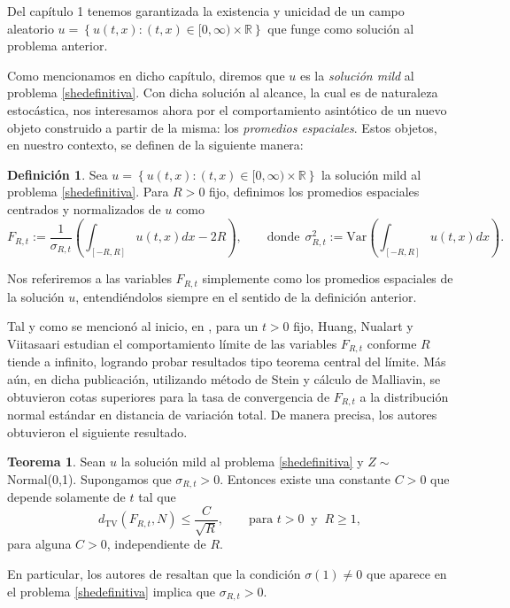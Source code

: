 \documentclass[letterpaper,twoside,12pt]{book}
\newcommand{\R}{\mathbb{R}}
\newcommand{\1}{\mathds{1}}
\theoremstyle{definition}
\newtheorem{dfn}{Definición}
\theoremstyle{definition}
\newtheorem{teo}{Teorema}
\theoremstyle{remark}
\theoremstyle{definition}
\theoremstyle{definition}
\theoremstyle{definition}
\theoremstyle{definition}
\theoremstyle{definition}
\begin{document}
Del capítulo 1 tenemos garantizada la existencia y unicidad de un campo aleatorio  $u=\left\{u(t,x):(t,x)\in [0,\infty)\times\R\right\}$ que funge como solución al problema anterior. 

Como mencionamos en dicho capítulo, diremos que $u$ es la \textit{solución mild} al problema \eqref{shedefinitiva}. Con dicha solución al alcance, la cual es de naturaleza estocástica, nos interesamos ahora por el comportamiento asintótico de un nuevo objeto construido a partir de la misma: los \textit{promedios espaciales}. Estos objetos, en nuestro contexto, se definen de la siguiente manera:

\begin{dfn}\label{defpromediosespaciales}
 Sea $u=\left\{u(t,x):(t,x)\in [0,\infty)\times\R\right\}$ la solución mild al problema \eqref{shedefinitiva}. Para $R>0$ fijo, definimos los promedios espaciales centrados y normalizados de $u$ como 
 \begin{equation*}
   F_{R,t}:=\frac{1}{\sigma_{R,t}}\left(\int_{[-R,R]}u(t,x)dx -2R\right), \qquad \text{donde} \ \ \sigma^2_{R,t}:=\text{Var}\left(\int_{[-R,R]}u(t,x)dx\right).
\end{equation*}
 \end{dfn}
Nos referiremos a las variables $F_{R,t}$ simplemente como los promedios espaciales de la solución $u$, entendiéndolos siempre en el sentido de la definición anterior.

Tal y como se mencionó al inicio, en \cite{HUANG20207170}, para un $t>0$ fijo, Huang, Nualart y Viitasaari estudian el comportamiento límite de las variables $F_{R,t}$ conforme $R$ tiende a infinito, logrando probar resultados tipo teorema central del límite. Más aún, en dicha publicación, utilizando método de Stein y cálculo de Malliavin, se obtuvieron cotas superiores para la tasa de convergencia de $F_{R,t}$ a la distribución normal estándar en distancia de variación total. De manera precisa, los autores obtuvieron el siguiente resultado.

\begin{teo} 
 Sean $u$ la solución mild al problema \eqref{shedefinitiva} y $Z\sim$ Normal(0,1). Supongamos que $\sigma_{R,t}>0$. Entonces existe una constante $C>0$ que depende solamente de $t$ tal que 
 \begin{equation}\label{teohuang}
    d_{\text{TV}}(F_{R,t},N)\leq \frac{C}{\sqrt{R}}, \qquad \text{para }t>0 \ \text{ y } \ R\geq1,  
 \end{equation}
 para alguna $C>0$, independiente de $R$.
 \end{teo}
En particular, los autores de \cite{HUANG20207170} resaltan que la condición $\sigma(1)\neq 0$ que aparece en el problema \eqref{shedefinitiva} implica que $\sigma_{R,t}>0$.
\end{document}
